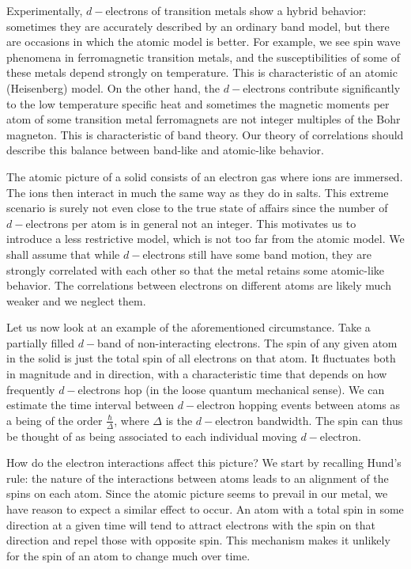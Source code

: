 \documentclass[10pt, twocolumn, twoside]{article}
\begin{document}
Experimentally, $d-$electrons of transition metals show a hybrid behavior: sometimes they are accurately described by an ordinary band model, but there are occasions in which the atomic model is better. For example, we see spin wave phenomena in ferromagnetic transition metals, and the susceptibilities of some of these metals depend strongly on temperature. This is characteristic of an atomic (Heisenberg) model. On the other hand, the $d-$electrons contribute significantly to the low temperature specific heat and sometimes the magnetic moments per atom of some transition metal ferromagnets are not integer multiples of the Bohr magneton. This is characteristic of band theory. Our theory of correlations should describe this balance between band-like and atomic-like behavior.

The atomic picture of a solid consists of an electron gas where ions are immersed. The ions then interact in much the same way as they do in salts. This extreme scenario is surely not even close to the true state of affairs since the number of $d-$electrons per atom is in general not an integer. This motivates us to introduce a less restrictive model, which is not too far from the atomic model. We shall assume that while $d-$electrons still have some band motion, they are strongly correlated with each other so that the metal retains some atomic-like behavior. The correlations between electrons on different atoms are likely much weaker and we neglect them.

Let us now look at an example of the aforementioned circumstance. Take a partially filled $d-$band of non-interacting electrons. The spin of any given atom in the solid is just the total spin of all electrons on that atom. It fluctuates both in magnitude and in direction, with a characteristic time that depends on how frequently $d-$electrons hop (in the loose quantum mechanical sense). We can estimate the time interval between $d-$electron hopping events between atoms as a being of the order $\frac{\hbar}{\Delta}$, where $\Delta$ is the $d-$electron bandwidth. The spin can thus be thought of as being associated to each individual moving $d-$electron.

How do the electron interactions affect this picture? We start by recalling Hund's rule: the nature of the  interactions between atoms leads to an alignment of the spins on each atom. Since the atomic picture seems to prevail in our metal, we have reason to expect a similar effect to occur. An atom with a total spin in some direction at a given time will tend to attract electrons with the spin on that direction and repel those with opposite spin. This mechanism makes it unlikely for the spin of an atom to change much over time.
\end{document}
